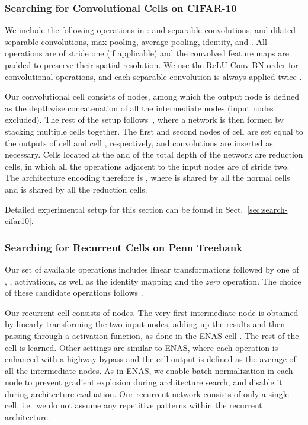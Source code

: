 \documentclass{article}
\begin{document}
\subsubsection{Searching for Convolutional Cells on CIFAR-10}
We include the following operations in :  and  separable convolutions,
 and  dilated separable convolutions,
 max pooling,
 average pooling,
identity,
and .
All operations are of stride one (if applicable) and the convolved feature maps are padded to preserve their spatial resolution.
We use the ReLU-Conv-BN order for convolutional operations,
and each separable convolution is always applied twice \citep{zoph2017learning, real2018regularized, liu2017progressive}.

Our convolutional cell consists of  nodes,
among which the output node is defined as the depthwise concatenation of all the intermediate nodes (input nodes excluded).
The rest of the setup follows~\cite{zoph2017learning, liu2017progressive, real2018regularized},
where a network is then formed by stacking multiple cells together.
The first and second nodes of cell 
are set equal to the outputs of cell  and cell , respectively,
and  convolutions are inserted as necessary.
Cells located at the  and  of the total depth of the network are reduction cells,
in which all the operations adjacent to the input nodes are of stride two.
The architecture encoding therefore is ,
where  is shared by all the normal cells and  is shared by all the reduction cells.

Detailed experimental setup for this section can be found in Sect.~\ref{sec:search-cifar10}.

\subsubsection{Searching for Recurrent Cells on Penn Treebank}
Our set of available operations includes linear transformations followed by one of , ,
  activations, as well as the identity mapping and the \emph{zero} operation.
 The choice of these candidate operations follows \cite{zoph2016neural, pham2018efficient}.
 
Our recurrent cell consists of  nodes.
The very first intermediate node is obtained by linearly transforming the two input nodes,
adding up the results and then passing through a  activation function,
as done in the ENAS cell \citep{pham2018efficient}.
The rest of the cell is learned.
Other settings are similar to ENAS,
where each operation is enhanced with a highway bypass \citep{zilly2016recurrent} and the cell output is defined as the average of all the intermediate nodes.
As in ENAS,
we enable batch normalization in each node to prevent gradient explosion during architecture search,
and disable it during architecture evaluation.
Our recurrent network consists of only a single cell, i.e.\ we do not assume any repetitive patterns within the recurrent architecture.
\end{document}
